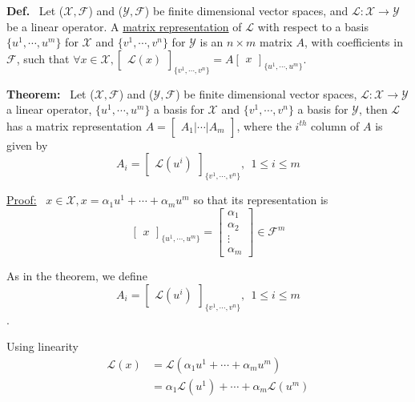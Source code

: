 \documentclass[letterpaper]{article}
\begin{document}
\noindent \textbf{Def.}~ Let ($\mathcal{X}, \mathcal{F}$) and ($\mathcal{Y}, \mathcal{F}$) be finite dimensional vector spaces, and $\mathcal{L}: \mathcal{X} \rightarrow \mathcal{Y}$ be a linear operator. A \underline{matrix representation} of $\mathcal{L}$ with respect to a basis $\{u^1,\dotsb,u^m\}$ for $\mathcal{X}$ and $\{v^1,\dotsb,v^n\}$ for $\mathcal{Y}$ is an $n \times m$ matrix $A$, with coefficients in $\mathcal{F}$, such that $\forall x \in \mathcal{X}, \begin{bmatrix} \mathcal{L}(x) \end{bmatrix}_{\{v^1,\dotsb,v^n\}} = A \begin{bmatrix} x \end{bmatrix}_{\{u^1,\dotsb,u^m\}}$.

\noindent \textbf{Theorem:}~ Let ($\mathcal{X}, \mathcal{F}$) and ($\mathcal{Y}, \mathcal{F}$) be finite dimensional vector spaces, $\mathcal{L}: \mathcal{X} \rightarrow \mathcal{Y}$ a linear operator, $\{u^1,\dotsb,u^m\}$ a basis for $\mathcal{X}$ and $\{v^1,\dotsb,v^n\}$ a basis for $\mathcal{Y}$, then $\mathcal{L}$ has a matrix representation $A = \begin{bmatrix} A_1 | \dotsb | A_m \end{bmatrix}$, where the $i^{th}$ column of $A$ is given by $$A_i = \begin{bmatrix}\mathcal{L}(u^i)\end{bmatrix}_{ \{v^1,\dotsb,v^n\} }, ~~1 \le i \le m$$

\underline{Proof:}~ $x \in \mathcal{X}, x = \alpha_1 u^1 + \dotsb + \alpha_m u^m $ so that its representation is
$$\begin{bmatrix}x\end{bmatrix}_{ \{u^1,\dotsb,u^m\}} = \begin{bmatrix}\alpha_1 \\ \alpha_2 \\ \vdots \\ \alpha_m \end{bmatrix}\in \mathcal{F}^m$$

    As in the theorem, we define $$A_i = \begin{bmatrix}\mathcal{L}(u^i)\end{bmatrix}_{ \{v^1,\dotsb,v^n\} }, ~~1 \le i \le m$$.

    \newpage
    Using linearity
    \begin{align*}
        \mathcal{L}(x) &= \mathcal{L}(\alpha_1 u^1 + \dotsb + \alpha_m u^m)\\
        &= \alpha_1 \mathcal{L}(u^1) + \dotsb + \alpha_m \mathcal{L}(u^m)
    \end{align*}
\end{document}
